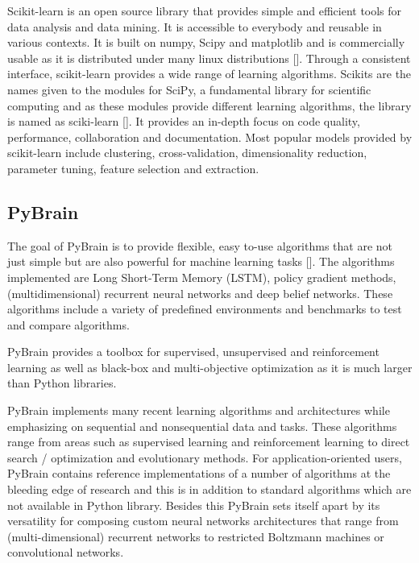 Scikit-learn is an open source library that provides simple and
efficient tools for data analysis and data mining. It is accessible to
everybody and reusable in various contexts. It is built on numpy,
Scipy and matplotlib and is commercially usable as it is distributed
under many linux distributions [\cite{scik1}]. Through a consistent
interface, scikit-learn provides a wide range of learning
algorithms. Scikits are the names given to the modules for SciPy, a
fundamental library for scientific computing and as these modules
provide different learning algorithms, the library is named as
sciki-learn [\cite{scik2}]. It provides an in-depth focus on code
quality, performance, collaboration and documentation. Most popular
models provided by scikit-learn include clustering, cross-validation,
dimensionality reduction, parameter tuning, feature selection and
extraction.

\subsection{PyBrain}

The goal of PyBrain is to provide flexible, easy to-use algorithms
that are not just simple but are also powerful for machine learning
tasks [\cite{article-pybrain}].  The algorithms implemented are Long
Short-Term Memory (LSTM), policy gradient methods, (multidimensional)
recurrent neural networks and deep belief networks. These algorithms
include a variety of predefined environments and benchmarks to test
and compare algorithms.

PyBrain provides a toolbox for supervised, unsupervised and
reinforcement learning as well as black-box and multi-objective
optimization as it is much larger than Python libraries.

PyBrain implements many recent learning algorithms and architectures
while emphasizing on sequential and nonsequential data and
tasks. These algorithms range from areas such as supervised learning
and reinforcement learning to direct search / optimization and
evolutionary methods.  For application-oriented users, PyBrain
contains reference implementations of a number of algorithms at the
bleeding edge of research and this is in addition to standard
algorithms which are not available in Python library. Besides this
PyBrain sets itself apart by its versatility for composing custom
neural networks architectures that range from (multi-dimensional)
recurrent networks to restricted Boltzmann machines or convolutional
networks.


